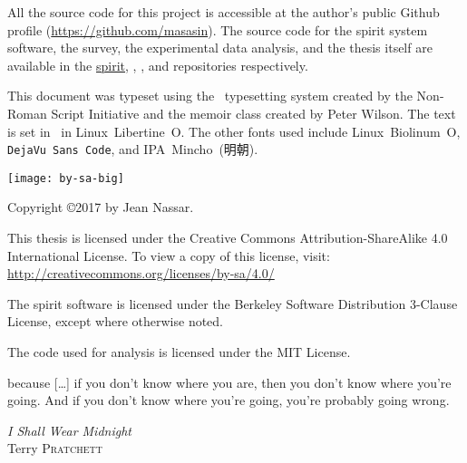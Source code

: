 \begin{titlingpage}
\maketitle
\thispagestyle{empty}

\clearpage
\null\vfill
\noindent \emph{\mytitle}

\noindent \emph{\mytitlejp}
\vspace{1em}

\noindent All the source code for this project is accessible at the author's public Github profile (\url{https://github.com/masasin}).
The source code for the \acrshort{spirit} system software, the survey, the experimental data analysis, and the thesis itself are available in the \href{https://github.com/masasin/spirit}{\textsf{spirit}}, \href{https://github.com/masasin/spirit_survey}{\textsf{}}, \href{https://github.com/masasin/spirit_analysis}{\textsf{}}, and \href{https://github.com/masasin/spirit_thesis}{\textsf{}} repositories respectively.
\vspace{1em}

\noindent This document was typeset using the \XeTeX\ typesetting system created by the Non-Roman Script Initiative and the \textsf{memoir} class created by Peter Wilson.
The text is set in \mytextsize\ in Linux~Libertine~O.
The other fonts used include \textsf{Linux~Biolinum~O}, \texttt{DejaVu~Sans~Code}, and IPA~Mincho~(明朝).
\vspace{1em}

\noindent \texttt{[image: by-sa-big]}

\noindent
Copyright \copyright 2017 by Jean Nassar.

\noindent This thesis is licensed under the Creative Commons Attribution-ShareAlike 4.0 International License.
To view a copy of this license, visit:\\
\url{http://creativecommons.org/licenses/by-sa/4.0/}

\noindent The \acrshort{spirit} software is licensed under the Berkeley Software Distribution 3-Clause License, except where otherwise noted.

\noindent The code used for analysis is licensed under the MIT License.
\end{titlingpage}


\thispagestyle{empty}
\setlength{\epigraphwidth}{0.7\textwidth}
\null\vfill
\epigraph{
  because [\ldots] if you don't know where you are, then you don't know where you're going.
  And if you don't know where you're going, you're probably going wrong.}
  {\emph{I Shall Wear Midnight}\\
   Terry \textsc{Pratchett}}
\vfill\vfill\null

